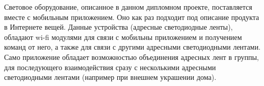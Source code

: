 Световое оборудование, описанное в данном дипломном проекте, поставляется вместе с мобильным приложением. Оно как раз подходит под описание продукта в Интернете вещей. Данные устройства (адресные светодиодные ленты), обладают wi-fi модулями для связи с мобильны приложением и получением команд от него, а также для связи с другими адресными светодиодными лентами. Само приложение обладает возможностью объединения адресных лент в группы, для последующего взаимодействия сразу с несколькими адресными светодиодными лентами (например при внешнем украшении дома).